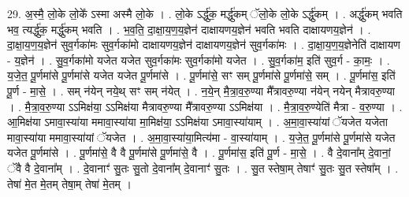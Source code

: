 \documentclass[17pt]{extarticle}
\begin{document}
29. अ॒स्मै॒ लो॒के लो॒के᳚ ऽस्मा अस्मै लो॒के । . लो॒के ऽर्द्धु॑क॒ मर्द्धु॑कम् ॅलो॒के लो॒के ऽर्द्धु॑कम् । . अर्द्धु॑कम् भवति भव॒ त्यर्द्धु॑क॒ मर्द्धु॑कम् भवति । . भ॒व॒ति॒ दा॒क्षा॒य॒ण॒य॒ज्ञेन॑ दाक्षायणय॒ज्ञेन॑ भवति भवति दाक्षायणय॒ज्ञेन॑ । . दा॒क्षा॒य॒ण॒य॒ज्ञेन॑ सुव॒र्गका॑मः सुव॒र्गका॑मो दाक्षायणय॒ज्ञेन॑ दाक्षायणय॒ज्ञेन॑ सुव॒र्गका॑मः । . दा॒क्षा॒य॒ण॒य॒ज्ञेनेति॑ दाक्षायण - य॒ज्ञेन॑ । . सु॒व॒र्गका॑मो यजेत यजेत सुव॒र्गका॑मः सुव॒र्गका॑मो यजेत । . सु॒व॒र्गका॑म॒ इति॑ सुव॒र्ग - का॒मः॒ । . य॒जे॒त॒ पू॒र्णमा॑से पू॒र्णमा॑से यजेत यजेत पू॒र्णमा॑से । . पू॒र्णमा॑से॒ सꣳ सम् पू॒र्णमा॑से पू॒र्णमा॑से॒ सम् । . पू॒र्णमा॑स॒ इति॑ पू॒र्ण - मा॒से॒ । . सम् न॑येन् नये॒थ् सꣳ सम् न॑येत् । . न॒ये॒न् मै॒त्रा॒व॒रु॒ण्या मै᳚त्रावरु॒ण्या न॑येन् नयेन् मैत्रावरु॒ण्या । . मै॒त्रा॒व॒रु॒ण्या ऽऽमिक्ष॑या॒ ऽऽमिक्ष॑या मैत्रावरु॒ण्या मै᳚त्रावरु॒ण्या ऽऽमिक्ष॑या । . मै॒त्रा॒व॒रु॒ण्येति॑ मैत्रा - व॒रु॒ण्या । . आ॒मिक्ष॑या ऽमावा॒स्या॑या ममावा॒स्या॑या मा॒मिक्ष॑या॒ ऽऽमिक्ष॑या ऽमावा॒स्या॑याम् । . अ॒मा॒वा॒स्या॑यां ॅयजेत यजेता मावा॒स्या॑या ममावा॒स्या॑यां ॅयजेत । . अ॒मा॒वा॒स्या॑या॒मित्य॑मा - वा॒स्या॑याम् । . य॒जे॒त॒ पू॒र्णमा॑से पू॒र्णमा॑से यजेत यजेत पू॒र्णमा॑से । . पू॒र्णमा॑से॒ वै वै पू॒र्णमा॑से पू॒र्णमा॑से॒ वै । . पू॒र्णमा॑स॒ इति॑ पू॒र्ण - मा॒से॒ । . वै दे॒वाना᳚म् दे॒वानां॒ ॅवै वै दे॒वाना᳚म् । . दे॒वानाꣳ॑ सु॒तः सु॒तो दे॒वाना᳚म् दे॒वानाꣳ॑ सु॒तः । . सु॒त स्तेषा॒म् तेषाꣳ॑ सु॒तः सु॒त स्तेषा᳚म् । . तेषा॑ मे॒त मे॒तम् तेषा॒म् तेषा॑ मे॒तम् । \newline
\end{document}

